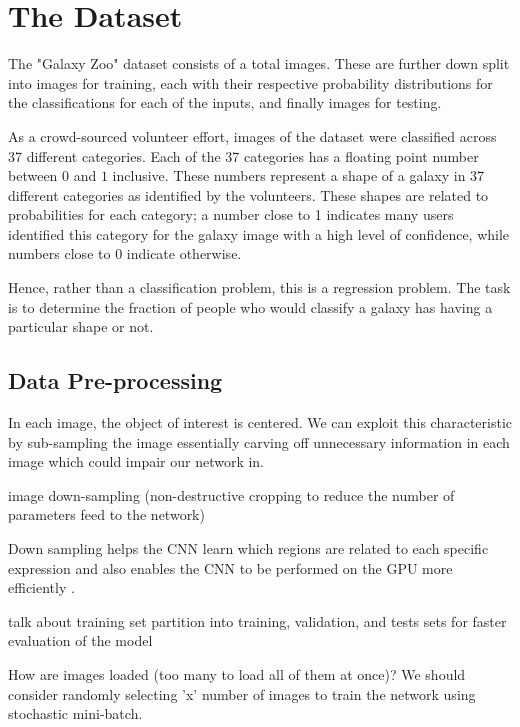 \section{The Dataset}

The "Galaxy Zoo" dataset consists of a total  images. These are further down split into  images for training, each with their respective probability distributions for the classifications for each of the inputs, and finally  images for testing.

As a crowd-sourced volunteer effort, images of the dataset were classified across 37 different categories. Each of the 37 categories has a floating point number between $0$ and $1$ inclusive. These numbers represent a shape of a galaxy in 37 different categories as identified by the volunteers. These shapes are related to probabilities for each category; a number close to 1 indicates many users identified this category for the galaxy image with a high level of confidence, while numbers close to $0$ indicate otherwise.

Hence, rather than a classification problem, this is a regression problem. The task is to determine the fraction of people who would classify a galaxy has having a particular shape or not.

\subsection{Data Pre-processing}

In each image, the object of interest is centered. We can exploit this characteristic by sub-sampling the image essentially carving off unnecessary information in each image which could impair our network in.

image down-sampling (non-destructive cropping to reduce the number of parameters feed to the network)

Down sampling helps the CNN learn which regions are related to each specific expression and also enables the CNN to be performed on the GPU more efficiently \cite{deep-learning-review}.

talk about training set partition into training, validation, and tests sets for faster evaluation of the model

How are images loaded (too many to load all of them at once)? We should consider randomly selecting 'x' number of images to train the network using stochastic mini-batch.
